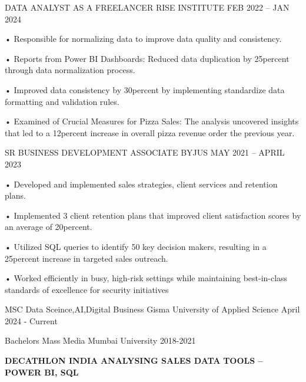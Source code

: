 \documentclass[11pt]{spidercv}
\begin{document}
    \begin{MainPart}

    \Experience
        {\ColorHighlight}
		{DATA ANALYST AS A FREELANCER}
		{RISE INSTITUTE}
        { FEB 2022 – JAN 2024\faUndo}
        {   
        • Responsible for normalizing data to improve data quality and consistency. 
        
        • Reports from Power BI Dashboards:  
Reduced data duplication by 25percent through data normalization process. 

        • Improved data consistency by 30percent by implementing standardize data formatting and validation rules.
        
        • Examined of Crucial Measures for Pizza Sales: The analysis uncovered insights that led to a 12percent increase in overall pizza revenue order the previous year.\\
        
        }
    \Experience
        {\ColorHighlight}
		{SR BUSINESS DEVELOPMENT ASSOCIATE}
		{BYJUS}
        { MAY 2021 – APRIL 2023}
        {   
            • Developed and implemented sales strategies, client services and retention plans. 
            
• Implemented 3 client retention plans that improved client satisfaction scores by an average of 20percent.

• Utilized SQL queries to identify 50 key decision makers, resulting in a 25percent increase in targeted sales outreach. 

• Worked efficiently in busy, high-risk settings while maintaining best-in-class standards of excellence for security 
initiatives\\
        }


    \Experience
        {\ColorHighlight}
		{MSC Data Sceince,AI,Digital Business}
		{Gisma University of Applied Science}
        {April 2024 - Current}
       
    \Experience
        {\ColorHighlight}
		{Bachelors Mass Media}
		{Mumbai University}
        {2018-2021}

 \Projects
        
        
		{\textbf{DECATHLON INDIA}}
		{\textbf{ANALYSING SALES DATA}}
        {\textbf{ TOOLS – POWER BI, SQL\faUndo}}
        {   
        
}
\end{MainPart}
\end{document}
